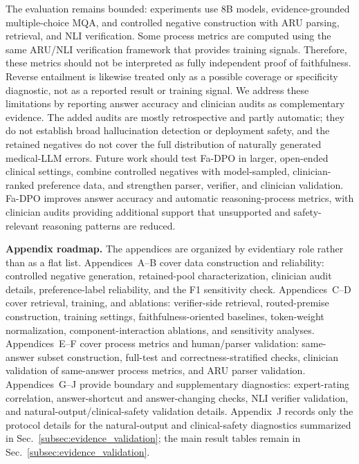 \documentclass[a4paper,fleqn,doubleblind]{cas-sc}
\begin{document}
The evaluation remains bounded: experiments use 8B models, evidence-grounded multiple-choice MQA, and controlled negative construction with ARU parsing, retrieval, and NLI verification. Some process metrics are computed using the same ARU/NLI verification framework that provides training signals. Therefore, these metrics should not be interpreted as fully independent proof of faithfulness. Reverse entailment is likewise treated only as a possible coverage or specificity diagnostic, not as a reported result or training signal. We address these limitations by reporting answer accuracy and clinician audits as complementary evidence. The added audits are mostly retrospective and partly automatic; they do not establish broad hallucination detection or deployment safety, and the retained negatives do not cover the full distribution of naturally generated medical-LLM errors. Future work should test Fa-DPO in larger, open-ended clinical settings, combine controlled negatives with model-sampled, clinician-ranked preference data, and strengthen parser, verifier, and clinician validation. Fa-DPO improves answer accuracy and automatic reasoning-process metrics, with clinician audits providing additional support that unsupported and safety-relevant reasoning patterns are reduced.

\newpage
\appendix

\noindent\textbf{Appendix roadmap.}
The appendices are organized by evidentiary role rather than as a flat list. Appendices~A--B cover data construction and reliability: controlled negative generation, retained-pool characterization, clinician audit details, preference-label reliability, and the F1 sensitivity check. Appendices~C--D cover retrieval, training, and ablations: verifier-side retrieval, routed-premise construction, training settings, faithfulness-oriented baselines, token-weight normalization, component-interaction ablations, and sensitivity analyses. Appendices~E--F cover process metrics and human/parser validation: same-answer subset construction, full-test and correctness-stratified checks, clinician validation of same-answer process metrics, and ARU parser validation. Appendices~G--J provide boundary and supplementary diagnostics: expert-rating correlation, answer-shortcut and answer-changing checks, NLI verifier validation, and natural-output/clinical-safety validation details. Appendix~J records only the protocol details for the natural-output and clinical-safety diagnostics summarized in Sec.~\ref{subsec:evidence_validation}; the main result tables remain in Sec.~\ref{subsec:evidence_validation}.
\end{document}

